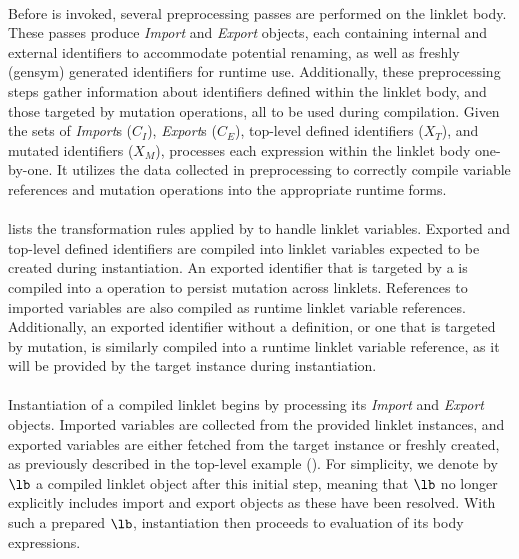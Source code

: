 		\paragraph{}%
			Before  is invoked, several preprocessing passes are performed on the linklet body. These passes produce \emph{Import} and \emph{Export} objects, each containing internal and external identifiers to accommodate potential renaming, as well as freshly (gensym) generated identifiers for runtime use. Additionally, these preprocessing steps gather information about identifiers defined within the linklet body, and those targeted by mutation operations, all to be used during compilation. Given the sets of \emph{Import}s ($\mathit{C_I}$), \emph{Export}s ($\mathit{C_E}$), top-level defined identifiers ($\mathit{X_T}$), and mutated identifiers ($\mathit{X_M}$),  processes each expression within the linklet body one-by-one. It utilizes the data collected in preprocessing to correctly compile variable references and mutation operations into the appropriate runtime forms.


		\vspace{-0.5cm}

		\paragraph{}%
			 lists the transformation rules applied by  to handle linklet variables. Exported and top-level defined identifiers are compiled into linklet variables expected to be created during instantiation. An exported identifier that is targeted by a  is compiled into a  operation to persist mutation across linklets. References to imported variables are also compiled as runtime linklet variable references. Additionally, an exported identifier without a definition, or one that is targeted by mutation, is similarly compiled into a runtime linklet variable reference, as it will be provided by the target instance during instantiation.

		\paragraph{}%
			Instantiation of a compiled linklet begins by processing its \emph{Import} and \emph{Export} objects. Imported variables are collected from the provided linklet instances, and exported variables are either fetched from the target instance or freshly created, as previously described in the top-level example (). For simplicity, we denote by $\lb$ a compiled linklet object after this initial step, meaning that $\lb$ no longer explicitly includes import and export objects as these have been resolved. With such a prepared $\lb$, instantiation then proceeds to evaluation of its body expressions.

